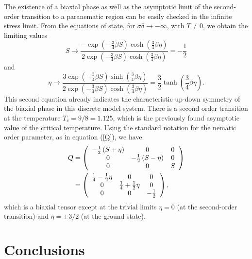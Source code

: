 \documentclass[aps,pre,reprint,amsmath,amssymbols,superscriptaddress,
nofootinbib]{revtex4-1}
\begin{document}
The existence of a biaxial phase as well as the asymptotic limit of the
second-order transition to a paranematic region can be easily checked in the
infinite stress limit. From the equations of state, for $\sigma\delta
\rightarrow-\infty$, with $T\neq0$, we obtain the limiting values%
\begin{equation}
S\rightarrow\frac{-\exp\left(  -\frac{3}{4}\beta S\right)  \cosh\left(
\frac{3}{4}\beta\eta\right)  }{2\exp\left(  -\frac{3}{4}\beta S\right)
\cosh\left(  \frac{3}{4}\beta\eta\right)  }=-\frac{1}{2}%
\end{equation}
and%
\begin{equation}
\eta\rightarrow\frac{3\exp\left(  -\frac{3}{4}\beta S\right)  \sinh\left(
\frac{3}{4}\beta\eta\right)  }{2\exp\left(  -\frac{3}{4}\beta S\right)
\cosh\left(  \frac{3}{4}\beta\eta\right)  }=\frac{3}{2}\tanh\left(  \frac
{3}{4}\beta\eta\right)  .
\end{equation}
This second equation already indicates the characteristic up-down symmetry of
the biaxial phase in this discrete model system. There is a second order
transition at the temperature $T_{c}=9/8=1.125$, which is the previously found
asymptotic value of the critical temperature. Using the standard notation for
the nematic order parameter, as in equation (\ref{Q}), we have%
\begin{align}
Q&=\left(
\begin{array}
[c]{ccc}%
-\frac{1}{2}\left(  S+\eta\right)  & 0 & 0\\
0 & -\frac{1}{2}\left(  S-\eta\right)  & 0\\
0 & 0 & S
\end{array}
\right)
\nonumber \\ &
=\left(
\begin{array}
[c]{ccc}%
\frac{1}{4}-\frac{1}{2}\eta & 0 & 0\\
0 & \frac{1}{4}+\frac{1}{2}\eta & 0\\
0 & 0 & -\frac{1}{2}%
\end{array}
\right)  ,
\end{align}
which is a biaxial tensor except at the trivial limits $\eta=0$ (at the
second-order transition) and $\eta=\pm3/2$ (at the ground state).

\section{Conclusions}
\end{document}
